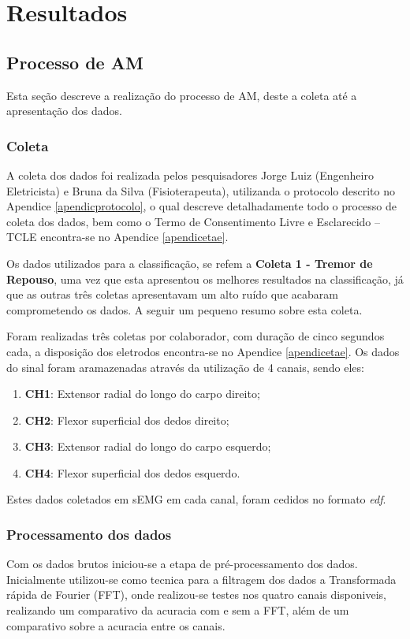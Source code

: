 \chapter{Resultados}
\label{ch:Resultados}
\section{Processo de AM}
Esta seção descreve a realização do processo de AM, deste a coleta até a apresentação dos dados.
\subsection{Coleta}
A coleta dos dados foi realizada pelos pesquisadores Jorge Luiz (Engenheiro Eletricista) e Bruna da Silva (Fisioterapeuta), utilizanda o protocolo descrito no Apendice \ref{apendicprotocolo}, o qual descreve detalhadamente todo o processo de coleta dos dados, bem como o Termo de Consentimento Livre e Esclarecido – TCLE encontra-se no  Apendice \ref{apendicetae}.

Os dados utilizados para a classificação, se refem a \textbf{Coleta 1 - Tremor de Repouso}, uma vez que esta apresentou os melhores resultados na classificação, já que as outras três coletas apresentavam um alto ruído que acabaram comprometendo os dados. A seguir um pequeno resumo sobre esta coleta.

Foram realizadas três coletas por colaborador, com duração de cinco segundos cada, a disposição dos eletrodos encontra-se no Apendice \ref{apendicetae}. Os dados do sinal foram aramazenadas através da utilização de 4 canais, sendo eles:
\begin{enumerate}
    \item \textbf{CH1}: Extensor radial do longo do carpo direito;
    \item \textbf{CH2}: Flexor superficial dos dedos direito;
    \item \textbf{CH3}: Extensor radial do longo do carpo esquerdo;
    \item \textbf{CH4}: Flexor superficial dos dedos esquerdo.
\end{enumerate}

Estes dados coletados em sEMG em cada canal, foram cedidos no formato \textit{edf}.

\subsection{Processamento dos dados}
Com os dados brutos iniciou-se a etapa de pré-processamento dos dados. Inicialmente utilizou-se como tecnica para a filtragem dos dados a Transformada rápida de Fourier (FFT), onde realizou-se testes nos quatro canais disponiveis, realizando um comparativo da acuracia com e sem a FFT, além de um comparativo sobre a acuracia entre os canais. 

